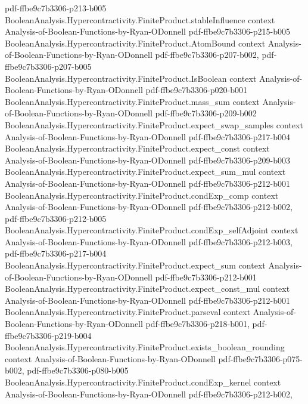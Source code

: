 \begin{theorem}
  {pdf-ffbe9c7b3306-p213-b005}
\proofstep
  {BooleanAnalysis.Hypercontractivity.FiniteProduct.stableInfluence}
  {context}
  {Analysis-of-Boolean-Functions-by-Ryan-ODonnell}
  {pdf-ffbe9c7b3306-p215-b005}
\proofstep
  {BooleanAnalysis.Hypercontractivity.FiniteProduct.AtomBound}
  {context}
  {Analysis-of-Boolean-Functions-by-Ryan-ODonnell}
  {pdf-ffbe9c7b3306-p207-b002,
    pdf-ffbe9c7b3306-p207-b005}
\proofstep
  {BooleanAnalysis.Hypercontractivity.FiniteProduct.IsBoolean}
  {context}
  {Analysis-of-Boolean-Functions-by-Ryan-ODonnell}
  {pdf-ffbe9c7b3306-p020-b001}
\proofstep
  {BooleanAnalysis.Hypercontractivity.FiniteProduct.mass_sum}
  {context}
  {Analysis-of-Boolean-Functions-by-Ryan-ODonnell}
  {pdf-ffbe9c7b3306-p209-b002}
\proofstep
  {BooleanAnalysis.Hypercontractivity.FiniteProduct.expect_swap_samples}
  {context}
  {Analysis-of-Boolean-Functions-by-Ryan-ODonnell}
  {pdf-ffbe9c7b3306-p217-b004}
\proofstep
  {BooleanAnalysis.Hypercontractivity.FiniteProduct.expect_const}
  {context}
  {Analysis-of-Boolean-Functions-by-Ryan-ODonnell}
  {pdf-ffbe9c7b3306-p209-b003}
\proofstep
  {BooleanAnalysis.Hypercontractivity.FiniteProduct.expect_sum_mul}
  {context}
  {Analysis-of-Boolean-Functions-by-Ryan-ODonnell}
  {pdf-ffbe9c7b3306-p212-b001}
\proofstep
  {BooleanAnalysis.Hypercontractivity.FiniteProduct.condExp_comp}
  {context}
  {Analysis-of-Boolean-Functions-by-Ryan-ODonnell}
  {pdf-ffbe9c7b3306-p212-b002,
    pdf-ffbe9c7b3306-p212-b005}
\proofstep
  {BooleanAnalysis.Hypercontractivity.FiniteProduct.condExp_selfAdjoint}
  {context}
  {Analysis-of-Boolean-Functions-by-Ryan-ODonnell}
  {pdf-ffbe9c7b3306-p212-b003,
    pdf-ffbe9c7b3306-p217-b004}
\proofstep
  {BooleanAnalysis.Hypercontractivity.FiniteProduct.expect_sum}
  {context}
  {Analysis-of-Boolean-Functions-by-Ryan-ODonnell}
  {pdf-ffbe9c7b3306-p212-b001}
\proofstep
  {BooleanAnalysis.Hypercontractivity.FiniteProduct.expect_const_mul}
  {context}
  {Analysis-of-Boolean-Functions-by-Ryan-ODonnell}
  {pdf-ffbe9c7b3306-p212-b001}
\proofstep
  {BooleanAnalysis.Hypercontractivity.FiniteProduct.parseval}
  {context}
  {Analysis-of-Boolean-Functions-by-Ryan-ODonnell}
  {pdf-ffbe9c7b3306-p218-b001,
    pdf-ffbe9c7b3306-p219-b004}
\proofstep
  {BooleanAnalysis.Hypercontractivity.FiniteProduct.exists_boolean_rounding}
  {context}
  {Analysis-of-Boolean-Functions-by-Ryan-ODonnell}
  {pdf-ffbe9c7b3306-p075-b002,
    pdf-ffbe9c7b3306-p080-b005}
\proofstep
  {BooleanAnalysis.Hypercontractivity.FiniteProduct.condExp_kernel}
  {context}
  {Analysis-of-Boolean-Functions-by-Ryan-ODonnell}
  {pdf-ffbe9c7b3306-p212-b002,
}
\end{theorem}
